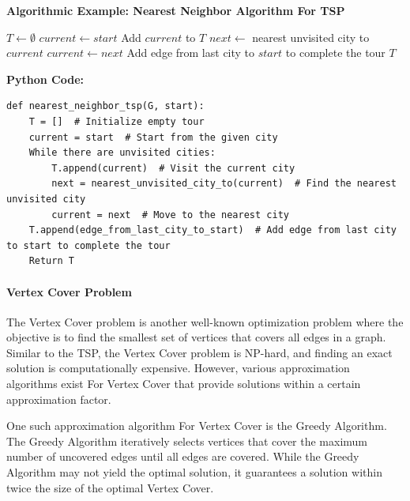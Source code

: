 \documentclass[12pt]{book} %
\begin{document}
\textbf{Algorithmic Example: Nearest Neighbor Algorithm For TSP}

\begin{algorithm}
\caption{Nearest Neighbor Algorithm For TSP}
\begin{algorithmic}[1]
    \State $T \gets \emptyset$ 
    \State $current \gets start$ 
        \State Add $current$ to $T$ 
        \State $next \gets$ nearest unvisited city to $current$ 
        \State $current \gets next$ 
    \EndWhile
    \State Add edge from last city to $start$ to complete the tour
    \State \Return $T$
\EndFunction
\end{algorithmic}
\end{algorithm}
\textbf{Python Code:}
\FloatBarrier
\begin{verbatim}
def nearest_neighbor_tsp(G, start):
    T = []  # Initialize empty tour
    current = start  # Start from the given city
    While there are unvisited cities:
        T.append(current)  # Visit the current city
        next = nearest_unvisited_city_to(current)  # Find the nearest unvisited city
        current = next  # Move to the nearest city
    T.append(edge_from_last_city_to_start)  # Add edge from last city to start to complete the tour
    Return T
\end{verbatim}
\FloatBarrier
\paragraph{Vertex Cover Problem}
The Vertex Cover problem is another well-known optimization problem where the objective is to find the smallest set of vertices that covers all edges in a graph. Similar to the TSP, the Vertex Cover problem is NP-hard, and finding an exact solution is computationally expensive. However, various approximation algorithms exist For Vertex Cover that provide solutions within a certain approximation factor.

One such approximation algorithm For Vertex Cover is the Greedy Algorithm. The Greedy Algorithm iteratively selects vertices that cover the maximum number of uncovered edges until all edges are covered. While the Greedy Algorithm may not yield the optimal solution, it guarantees a solution within twice the size of the optimal Vertex Cover.
\end{document}
